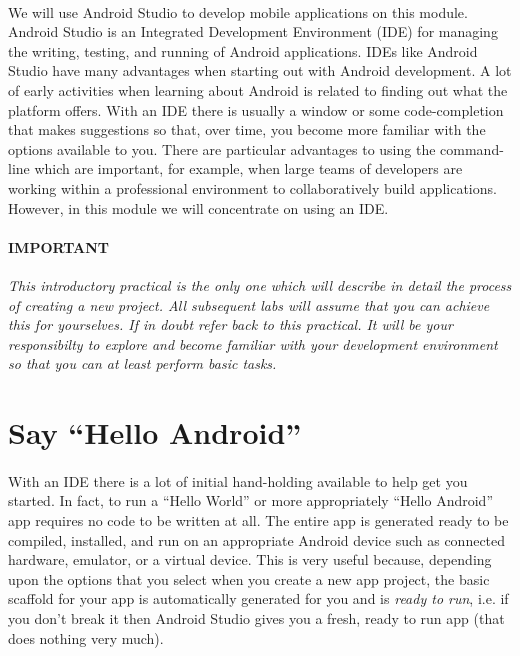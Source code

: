 \paragraph{} We will use Android Studio to develop mobile applications on this module. Android Studio is an Integrated Development Environment (IDE) for managing the writing, testing, and running of Android applications. IDEs like Android Studio have many advantages when starting out with Android development. A lot of early activities when learning about Android is related to finding out what the platform offers. With an IDE there is usually a window or some code-completion that makes suggestions so that, over time, you become more familiar with the options available to you. There are particular advantages to using the command-line which are important, for example, when large teams of developers are working within a professional environment to collaboratively build applications. However, in this module we will concentrate on using an IDE.

\begin{framed}
\paragraph{IMPORTANT} \emph{This introductory practical is the only one which will describe in detail the process of creating a new project. All subsequent labs will assume that you can achieve this for yourselves. If in doubt refer back to this practical. It will be your responsibilty to explore and become familiar with your development environment so that you can at least perform basic tasks.}
\end{framed}

\section{Say ``Hello Android''}
\label{hello}
\paragraph{} With an IDE there is a lot of initial hand-holding available to help get you started. In fact, to run a ``Hello World'' or more appropriately ``Hello Android'' app requires no code to be written at all. The entire app is generated ready to be compiled, installed, and run on an appropriate Android device such as connected hardware, emulator, or a virtual device. This is very useful because, depending upon the options that you select when you create a new app project, the basic scaffold for your app is automatically generated for you and is \emph{ready to run}, i.e. if you don't break it then Android Studio gives you a fresh, ready to run app (that does nothing very much). 

